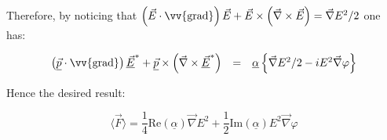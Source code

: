 \documentclass[reprint,amsmath,amssymb,aps,nofootinbib]{revtex4-1}
\begin{document}
Therefore, by noticing that $\left(\vec{E}\cdot\vv{\text{grad}}\right)\vec{E}+\vec{E}\times\left(\vec{\nabla}\times\vec{E}\right)=\vec{\nabla}E^{2}/2$ one has:

\[
\begin{array}{lllll}

\left(\underline{\vec{p}}\cdot\vv{\text{grad}}\right)\underline{\vec{E}}^{*} + \underline{\vec{p}}\times\left(\vec{\nabla}\times\underline{\vec{E}}^{*}\right) 
&=&
\underline{\alpha}\left\lbrace \vec{\nabla}E^{2}/2 -iE^{2}\vec{\nabla}\varphi\right\rbrace \\

\end{array}
\]

Hence the desired result:

\[\langle\vec{F}\rangle=\frac{1}{4}\text{Re}(\underline{\alpha})\vec{\nabla}E^{2}+\frac{1}{2}\text{Im}(\underline{\alpha})E^{2}\vec{\nabla}\varphi\]
\end{document}
